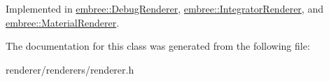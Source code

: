 Implemented in \hyperlink{classembree_1_1_debug_renderer_a98745dd04e9ec45e509f4f68789d9cfc}{embree::DebugRenderer}, \hyperlink{classembree_1_1_integrator_renderer_a65864dbadddc1920c3ad6269bae24c67}{embree::IntegratorRenderer}, and \hyperlink{classembree_1_1_material_renderer_a0323dad0c9e38127460ea8f4651d5fbc}{embree::MaterialRenderer}.



The documentation for this class was generated from the following file:\begin{DoxyCompactItemize}
\item 
renderer/renderers/renderer.h\end{DoxyCompactItemize}

